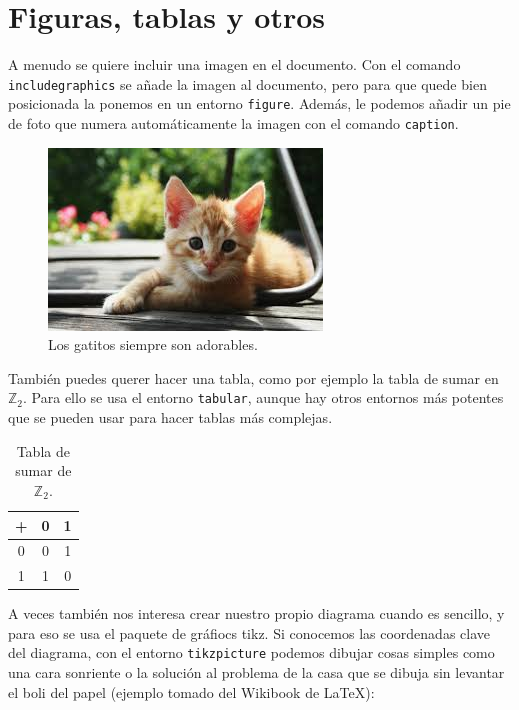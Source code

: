 \documentclass[a4paper]{article}
\begin{document}
           

\section{Figuras, tablas y otros}
A menudo se quiere incluir una imagen en el documento. Con el comando \texttt{includegraphics} se añade la imagen al documento, pero para que quede bien posicionada la ponemos en un entorno \texttt{figure}. Además, le podemos añadir un pie de foto que numera automáticamente la imagen con el comando \texttt{caption}.

\begin{figure}[H]
  \centering
    \includegraphics{images/kittens.jpeg}
  \caption{Los gatitos siempre son adorables.}
\end{figure}

También puedes querer hacer una tabla, como por ejemplo la tabla de sumar en $\mathbb{Z}_2$. Para ello se usa el entorno \texttt{tabular}, aunque hay otros entornos más potentes que se pueden usar para hacer tablas más complejas.

\begin{table}[H]
  \centering
  \begin{tabular}{c || c | c}
    + & 0 & 1 \\ \hline \hline
    0 & 0 & 1 \\ \hline
    1 & 1 & 0
  \end{tabular}
  \caption{Tabla de sumar de $\mathbb{Z}_2$.}
\end{table}

A veces también nos interesa crear nuestro propio diagrama cuando es sencillo, y para eso se usa el paquete de gráfiocs tikz. Si conocemos las coordenadas clave del diagrama, con el entorno \texttt{tikzpicture} podemos dibujar cosas simples como una cara sonriente o la solución al problema de la casa que se dibuja sin levantar el boli del papel (ejemplo tomado del Wikibook de \LaTeX):


\begin{figure}[H]
  \centering
\end{figure}
\end{document}
